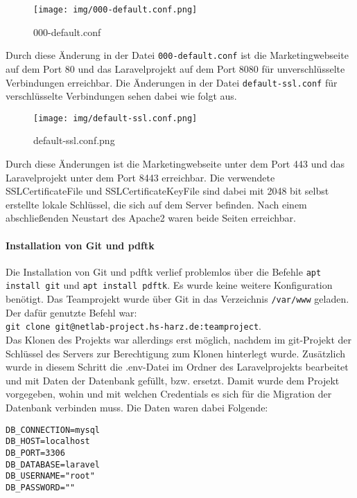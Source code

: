 \documentclass[12pt,a4paper]{scrartcl}
\newcommand{\code}[1]{\texttt{#1}}
\begin{document}
\begin{figure}[H]
	\centering
	\texttt{[image: img/000-default.conf.png]}
	\caption{000-default.conf}
	\label{fig:bpmn-process}
\end{figure}

Durch diese Änderung in der Datei \code{000-default.conf} ist die Marketingwebseite auf dem Port 80 und das Laravelprojekt auf dem Port 8080 für unverschlüsselte Verbindungen erreichbar.
Die Änderungen in der Datei \code{default-ssl.conf} für verschlüsselte Verbindungen sehen dabei wie folgt aus.

\begin{figure}[H]
	\centering
	\texttt{[image: img/default-ssl.conf.png]}
	\caption{default-ssl.conf.png}
	\label{fig:bpmn-process}
\end{figure}

Durch diese Änderungen ist die Marketingwebseite unter dem Port 443 und das Laravelprojekt unter dem Port 8443 erreichbar. Die verwendete SSLCertificateFile und SSLCertificateKeyFile sind dabei mit 2048 bit selbst erstellte lokale Schlüssel, die sich auf dem Server befinden. Nach einem abschließenden Neustart des Apache2 waren beide Seiten erreichbar.

\paragraph{Installation von Git und pdftk}
Die Installation von Git und pdftk verlief problemlos über die Befehle \code{apt install git} und \code{apt install pdftk}.
Es wurde keine weitere Konfiguration benötigt.
Das Teamprojekt wurde über Git in das Verzeichnis \code{/var/www} geladen. Der dafür genutzte Befehl war: \\ \code{git clone git@netlab-project.hs-harz.de:teamproject}.\\
Das Klonen des Projekts war allerdings erst möglich, nachdem im git-Projekt der Schlüssel des Servers zur Berechtigung zum Klonen hinterlegt wurde.
Zusätzlich wurde in diesem Schritt die .env-Datei im Ordner des Laravelprojekts bearbeitet und mit Daten der Datenbank gefüllt, bzw. ersetzt.
Damit wurde dem Projekt vorgegeben, wohin und mit welchen Credentials es sich für die Migration der Datenbank verbinden muss. Die Daten waren dabei Folgende:
\begin{lstlisting}
DB_CONNECTION=mysql
DB_HOST=localhost
DB_PORT=3306
DB_DATABASE=laravel
DB_USERNAME="root"
DB_PASSWORD=""
\end{lstlisting}
\end{document}
